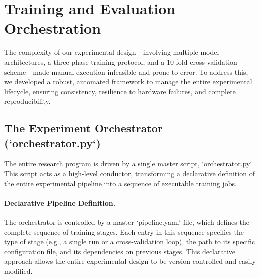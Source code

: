 \section{Training and Evaluation Orchestration}
\label{sec:impl_orchestration}

The complexity of our experimental design—involving multiple model architectures, a three-phase training protocol, and a 10-fold cross-validation scheme—made manual execution infeasible and prone to error. To address this, we developed a robust, automated framework to manage the entire experimental lifecycle, ensuring consistency, resilience to hardware failures, and complete reproducibility.

\subsection{The Experiment Orchestrator (`orchestrator.py`)}
The entire research program is driven by a single master script, `orchestrator.py`. This script acts as a high-level conductor, transforming a declarative definition of the entire experimental pipeline into a sequence of executable training jobs.

\paragraph{Declarative Pipeline Definition.} The orchestrator is controlled by a master `pipeline.yaml` file, which defines the complete sequence of training stages. Each entry in this sequence specifies the type of stage (e.g., a single run or a cross-validation loop), the path to its specific configuration file, and its dependencies on previous stages. This declarative approach allows the entire experimental design to be version-controlled and easily modified.

